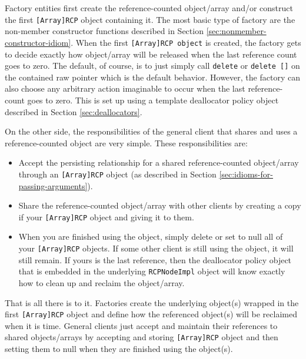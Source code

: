 \documentclass[pdf,ps2pdf,11pt]{SANDreport}
\begin{document}
Factory entities first create the reference-counted object/array
and/or construct the first {}\texttt{[Array]RCP} object containing it.
The most basic type of factory are the non-member constructor
functions described in Section
{}\ref{sec:nonmember-constructor-idiom}.  When the first
{}\texttt{[Array]RCP object} is created, the factory gets to decide
exactly how object/array will be released when the last reference
count goes to zero.  The default, of course, is to just simply call
{}\texttt{delete} or {}\texttt{delete []} on the contained raw pointer
which is the default behavior.  However, the factory can also choose
any arbitrary action imaginable to occur when the last reference-count
goes to zero.  This is set up using a template deallocator policy
object described in Section {}\ref{sec:deallocators}.

On the other side, the responsibilities of the general client that
shares and uses a reference-counted object are very simple.  These
responsibilities are:

\begin{itemize}

{}\item Accept the persisting relationship for a shared
reference-counted object/array through an {}\texttt{[Array]RCP} object
(as described in Section {}\ref{sec:idioms-for-passing-arguments}).

{}\item Share the reference-counted object/array with other clients by
creating a copy if your {}\texttt{[Array]RCP} object and giving it to
them.

{}\item When you are finished using the object, simply delete or set
to null all of your {}\texttt{[Array]RCP} objects.  If some other
client is still using the object, it will still remain.  If yours is
the last reference, then the deallocator policy object that is
embedded in the underlying {}\texttt{RCPNodeImpl} object will know
exactly how to clean up and reclaim the object/array.

\end{itemize}

That is all there is to it.  Factories create the underlying object(s)
wrapped in the first {}\texttt{[Array]RCP} object and define how the
referenced object(s) will be reclaimed when it is time.  General
clients just accept and maintain their references to shared
objects/arrays by accepting and storing {}\texttt{[Array]RCP} object
and then setting them to null when they are finished using the
object(s).
\end{document}
